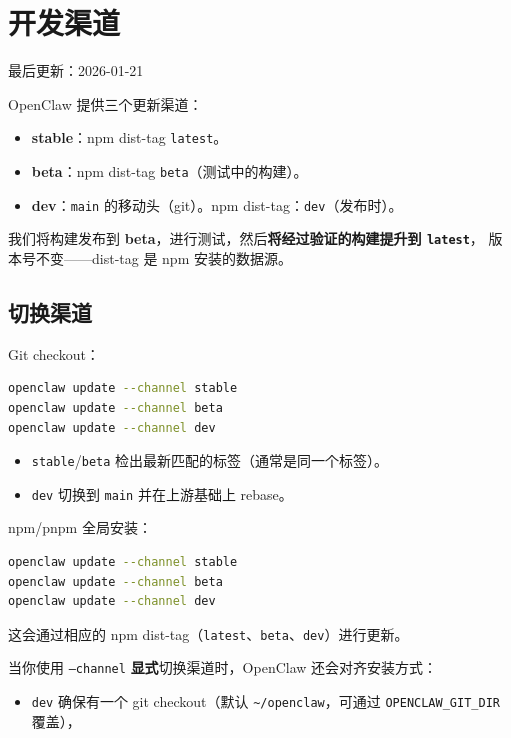 \section{开发渠道}


最后更新：2026-01-21

OpenClaw 提供三个更新渠道：

\begin{itemize}
  \item \textbf{stable}：npm dist-tag \texttt{latest}。
  \item \textbf{beta}：npm dist-tag \texttt{beta}（测试中的构建）。
  \item \textbf{dev}：\texttt{main} 的移动头（git）。npm dist-tag：\texttt{dev}（发布时）。
\end{itemize}


我们将构建发布到 \textbf{beta}，进行测试，然后\textbf{将经过验证的构建提升到 \texttt{latest}}，
版本号不变——dist-tag 是 npm 安装的数据源。

\subsection{切换渠道}


Git checkout：

\begin{lstlisting}[language=bash]
openclaw update --channel stable
openclaw update --channel beta
openclaw update --channel dev
\end{lstlisting}


\begin{itemize}
  \item \texttt{stable}/\texttt{beta} 检出最新匹配的标签（通常是同一个标签）。
  \item \texttt{dev} 切换到 \texttt{main} 并在上游基础上 rebase。
\end{itemize}


npm/pnpm 全局安装：

\begin{lstlisting}[language=bash]
openclaw update --channel stable
openclaw update --channel beta
openclaw update --channel dev
\end{lstlisting}


这会通过相应的 npm dist-tag（\texttt{latest}、\texttt{beta}、\texttt{dev}）进行更新。

当你使用 \texttt{--channel} \textbf{显式}切换渠道时，OpenClaw 还会对齐安装方式：

\begin{itemize}
  \item \texttt{dev} 确保有一个 git checkout（默认 \texttt{\textasciitilde{}/openclaw}，可通过 \texttt{OPENCLAW\_GIT\_DIR} 覆盖），
\end{itemize}

